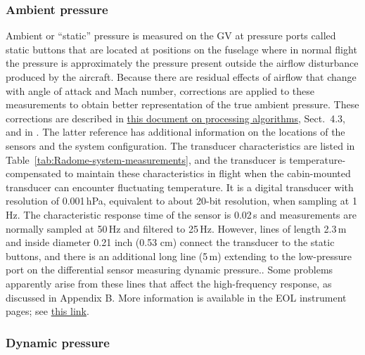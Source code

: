 \documentclass[12pt,twoside,english]{article}\usepackage[]{graphicx}\usepackage[]{color}
\let\OrgIndex\index
\renewcommand*{\index}[1]{\OrgIndex{#1}}
\begin{document}
{\subsubsection{Ambient pressure\label{sub:Ambient-pressure}}

Ambient or ``static'' pressure  is measured on the GV at pressure ports called static buttons that are located at positions on the fuselage where in normal flight the pressure is approximately the pressure present outside the airflow disturbance produced by the aircraft. Because there are residual effects of airflow that change with angle of attack and Mach number, corrections are applied to these measurements to obtain better representation of the true ambient pressure. These corrections are described in \href{https://drive.google.com/file/d/0B1kIUH45ca5ATFV5d3QyQ0JpSjA/view?usp=sharing}{this document on processing algorithms}, Sect.~4.3, and in \citet{CooperEtAl2014}. The latter reference has additional information on the locations of the sensors and the system configuration. The transducer characteristics are listed in Table~\ref{tab:Radome-system-measurements}, and the transducer is temperature-compensated to maintain these characteristics in flight when the cabin-mounted transducer can encounter fluctuating temperature. It is a digital transducer with resolution of 0.001\,hPa, equivalent to about 20-bit resolution, when sampling at 1\,Hz. The characteristic response time of the sensor is 0.02\,s and measurements are normally sampled at 50\,Hz and filtered to 25\,Hz. However, lines of length 2.3\,m and inside diameter 0.21 inch (0.53 cm) connect the transducer to the static buttons, and there is an additional long line (5\,m) extending to the low-pressure port on the differential sensor measuring dynamic pressure.. Some problems apparently arise from these lines that affect the high-frequency response, as discussed in Appendix B\@. More information is available in the EOL instrument pages; see \href{https://www.eol.ucar.edu/instruments/ambient-static-pressure}{this link}. 


\subsubsection{Dynamic pressure\label{sub:Dynamic-pressure}}

}
\end{document}
